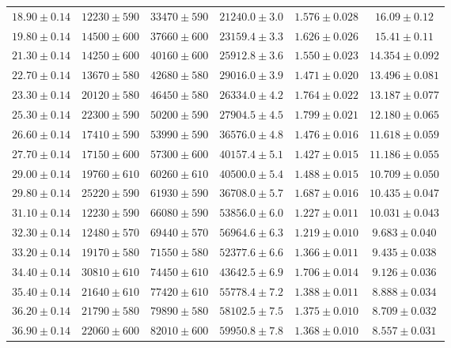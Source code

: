 \documentclass[a4paper,11pt]{article}
\begin{document}
\begin{longtable}{c c c c c c}
$18.90 \pm 0.14$ & $12230 \pm 590$ & $33470 \pm 590$ & $21240.0 \pm 3.0$ & $1.576 \pm 0.028$ & $16.09 \pm 0.12$ \\
$19.80 \pm 0.14$ & $14500 \pm 600$ & $37660 \pm 600$ & $23159.4 \pm 3.3$ & $1.626 \pm 0.026$ & $15.41 \pm 0.11$ \\
$21.30 \pm 0.14$ & $14250 \pm 600$ & $40160 \pm 600$ & $25912.8 \pm 3.6$ & $1.550 \pm 0.023$ & $14.354 \pm 0.092$ \\
$22.70 \pm 0.14$ & $13670 \pm 580$ & $42680 \pm 580$ & $29016.0 \pm 3.9$ & $1.471 \pm 0.020$ & $13.496 \pm 0.081$ \\
$23.30 \pm 0.14$ & $20120 \pm 580$ & $46450 \pm 580$ & $26334.0 \pm 4.2$ & $1.764 \pm 0.022$ & $13.187 \pm 0.077$ \\
$25.30 \pm 0.14$ & $22300 \pm 590$ & $50200 \pm 590$ & $27904.5 \pm 4.5$ & $1.799 \pm 0.021$ & $12.180 \pm 0.065$ \\
$26.60 \pm 0.14$ & $17410 \pm 590$ & $53990 \pm 590$ & $36576.0 \pm 4.8$ & $1.476 \pm 0.016$ & $11.618 \pm 0.059$ \\
$27.70 \pm 0.14$ & $17150 \pm 600$ & $57300 \pm 600$ & $40157.4 \pm 5.1$ & $1.427 \pm 0.015$ & $11.186 \pm 0.055$ \\
$29.00 \pm 0.14$ & $19760 \pm 610$ & $60260 \pm 610$ & $40500.0 \pm 5.4$ & $1.488 \pm 0.015$ & $10.709 \pm 0.050$ \\
$29.80 \pm 0.14$ & $25220 \pm 590$ & $61930 \pm 590$ & $36708.0 \pm 5.7$ & $1.687 \pm 0.016$ & $10.435 \pm 0.047$ \\
$31.10 \pm 0.14$ & $12230 \pm 590$ & $66080 \pm 590$ & $53856.0 \pm 6.0$ & $1.227 \pm 0.011$ & $10.031 \pm 0.043$ \\
$32.30 \pm 0.14$ & $12480 \pm 570$ & $69440 \pm 570$ & $56964.6 \pm 6.3$ & $1.219 \pm 0.010$ & $9.683 \pm 0.040$ \\
$33.20 \pm 0.14$ & $19170 \pm 580$ & $71550 \pm 580$ & $52377.6 \pm 6.6$ & $1.366 \pm 0.011$ & $9.435 \pm 0.038$ \\
$34.40 \pm 0.14$ & $30810 \pm 610$ & $74450 \pm 610$ & $43642.5 \pm 6.9$ & $1.706 \pm 0.014$ & $9.126 \pm 0.036$ \\
$35.40 \pm 0.14$ & $21640 \pm 610$ & $77420 \pm 610$ & $55778.4 \pm 7.2$ & $1.388 \pm 0.011$ & $8.888 \pm 0.034$ \\
$36.20 \pm 0.14$ & $21790 \pm 580$ & $79890 \pm 580$ & $58102.5 \pm 7.5$ & $1.375 \pm 0.010$ & $8.709 \pm 0.032$ \\
$36.90 \pm 0.14$ & $22060 \pm 600$ & $82010 \pm 600$ & $59950.8 \pm 7.8$ & $1.368 \pm 0.010$ & $8.557 \pm 0.031$ \\

\end{longtable}
\end{document}
